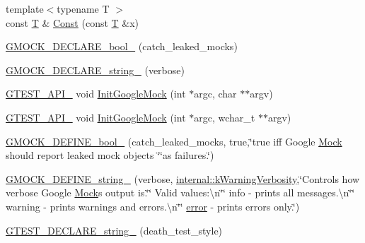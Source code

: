 \begin{DoxyCompactItemize}
\item 
{\footnotesize template$<$typename T $>$ }\\const \hyperlink{functions__7_8js_adf1f3edb9115acb0a1e04209b7a9937b}{T} \& \hyperlink{namespacetesting_a945ac56c5508a3c9c032bbe8aae8dcfa}{Const} (const \hyperlink{functions__7_8js_adf1f3edb9115acb0a1e04209b7a9937b}{T} \&x)
\item 
\hyperlink{namespacetesting_a9dd7591091234b86ce48ce1aff6feeb5}{G\+M\+O\+C\+K\+\_\+\+D\+E\+C\+L\+A\+R\+E\+\_\+bool\+\_\+} (catch\+\_\+leaked\+\_\+mocks)
\item 
\hyperlink{namespacetesting_a4dd099d1d538f26a16fcc2f94011b37e}{G\+M\+O\+C\+K\+\_\+\+D\+E\+C\+L\+A\+R\+E\+\_\+string\+\_\+} (verbose)
\item 
\hyperlink{gtest-port_8h_aa73be6f0ba4a7456180a94904ce17790}{G\+T\+E\+S\+T\+\_\+\+A\+P\+I\+\_\+} void \hyperlink{namespacetesting_a32b1c6db9ba5133ccabfa67616b3c041}{Init\+Google\+Mock} (int $\ast$argc, char $\ast$$\ast$argv)
\item 
\hyperlink{gtest-port_8h_aa73be6f0ba4a7456180a94904ce17790}{G\+T\+E\+S\+T\+\_\+\+A\+P\+I\+\_\+} void \hyperlink{namespacetesting_a20fb86152763dddef67bc1dd8b090800}{Init\+Google\+Mock} (int $\ast$argc, wchar\+\_\+t $\ast$$\ast$argv)
\item 
\hyperlink{namespacetesting_ac4efd3cec9fd78f180d825c1d178b970}{G\+M\+O\+C\+K\+\_\+\+D\+E\+F\+I\+N\+E\+\_\+bool\+\_\+} (catch\+\_\+leaked\+\_\+mocks, true,\char`\"{}true iff Google \hyperlink{classtesting_1_1_mock}{Mock} should report leaked mock objects \char`\"{}\char`\"{}as failures.\char`\"{})
\item 
\hyperlink{namespacetesting_a17cbc94a0a3ef8fdf7d58fc5dcdcce2a}{G\+M\+O\+C\+K\+\_\+\+D\+E\+F\+I\+N\+E\+\_\+string\+\_\+} (verbose, \hyperlink{namespacetesting_1_1internal_ad9386ccda6b6deac2f7b84784d3088c0}{internal\+::k\+Warning\+Verbosity},\char`\"{}Controls how verbose Google \hyperlink{classtesting_1_1_mock}{Mock}\textquotesingle{}s output is.\char`\"{}\char`\"{}  Valid values\+:\textbackslash{}n\char`\"{}\char`\"{}  info    -\/ prints all messages.\textbackslash{}n\char`\"{}\char`\"{}  warning -\/ prints warnings and errors.\textbackslash{}n\char`\"{}\char`\"{}  \hyperlink{_07copy_08_2_read_camera_model_8m_ac546fdc9911f4a876dbfaffbc7426f8b}{error}   -\/ prints errors only.\char`\"{})
\item 
\hyperlink{namespacetesting_a37b7e87f0a5f502c6918f37d1768c1f3}{G\+T\+E\+S\+T\+\_\+\+D\+E\+C\+L\+A\+R\+E\+\_\+string\+\_\+} (death\+\_\+test\+\_\+style)
\item 

\end{DoxyCompactItemize}
